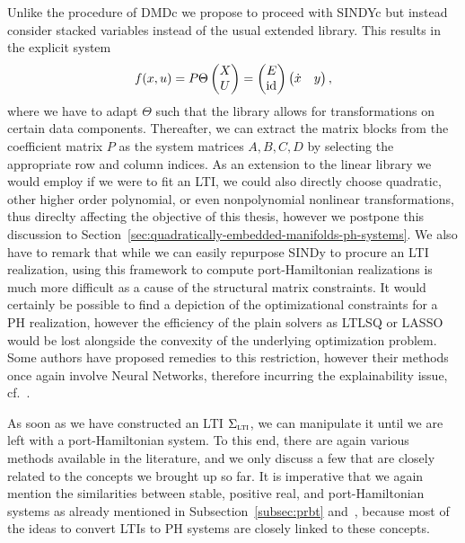 Unlike the procedure of DMDc we propose to proceed with \ac{SINDYc} but instead consider stacked variables instead of the usual extended library.
This results in the explicit system
\begin{equation}\label{eq:sindy-io}
    f(x, u) = P \Theta \begin{pmatrix}
        X \\
        U
    \end{pmatrix} = \begin{pmatrix}
        E \\
        \text{id}_{}
    \end{pmatrix} \begin{pmatrix}
        \dot{x} & y
    \end{pmatrix},
\end{equation}
where we have to adapt $\Theta$ such that the library allows for transformations on certain data components.
Thereafter, we can extract the matrix blocks from the coefficient matrix $P$ as the system matrices $A, B, C, D$ by selecting the appropriate row and column indices.
As an extension to the linear library we would employ if we were to fit an \ac{LTI}, we could also directly choose quadratic, other higher order polynomial, or even nonpolynomial nonlinear transformations, thus direclty affecting the objective of this thesis, however we postpone this discussion to Section~\ref{sec:quadratically-embedded-manifolds-ph-systems}.
We also have to remark that while we can easily repurpose \ac{SINDy} to procure an \ac{LTI} realization, using this framework to compute port-Hamiltonian realizations is much more difficult as a cause of the structural matrix constraints.
It would certainly be possible to find a depiction of the optimizational constraints for a \ac{PH} realization, however the efficiency of the plain solvers as LTLSQ or LASSO would be lost alongside the convexity of the underlying optimization problem.
Some authors have proposed remedies to this restriction, however their methods once again involve Neural Networks, therefore incurring the explainability issue, cf.~\cite{Lee2022}.



As soon as we have constructed an \ac{LTI} $\Sigma_{\textnormal{\scshape lti}}$, we can manipulate it until we are left with a port-Hamiltonian system.
To this end, there are again various methods available in the literature, and we only discuss a few that are closely related to the concepts we brought up so far.
It is imperative that we again mention the similarities between stable, positive real, and port-Hamiltonian systems as already mentioned in Subsection~\ref{subsec:prbt} and~\cite{Cherifi2022}, because most of the ideas to convert \acp{LTI} to \ac{PH} systems are closely linked to these concepts.

